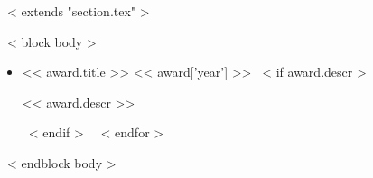 ~< extends "section.tex" >~

~< block body >~
\begin{itemize}
  ~< for award in items >~
    \item << award.title >> \hfill << award['year'] >>
    ~< if award.descr >~
      \begin{itemize}
      << award.descr >>
      \end{itemize}
    ~< endif >~
  ~< endfor >~
\end{itemize}
~< endblock body >~
